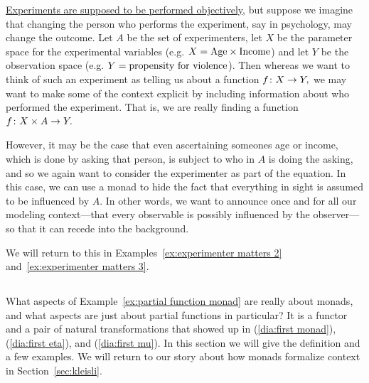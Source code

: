 \documentclass[../main/CT4S-EN-RU]{subfiles}
\begin{document}
\begin{exampleRUS}\label{ex:partial function monad}
\end{exampleRUS}

\begin{applicationENG}\label{app:experimenter matters}
\href{http://en.wikipedia.org/wiki/Observer-expectancy_effect}{\text Experiments are supposed to be performed objectively}, but suppose we imagine that changing the person who performs the experiment, say in psychology, may change the outcome. Let $A$ be the set of experimenters, let $X$ be the parameter space for the experimental variables (e.g. $X=\textnormal{Age}\times\textnormal{Income}$) and let $Y$ be the observation space (e.g. $Y=\textnormal{propensity for violence}$). Then whereas we want to think of such an experiment as telling us about a function $f\colon X\rightarrow Y,$ we may want to make some of the context explicit by including information about who performed the experiment. That is, we are really finding a function $f\colon X\times A\rightarrow Y.$ 

However, it may be the case that even ascertaining someones age or income, which is done by asking that person, is subject to who in $A$ is doing the asking, and so we again want to consider the experimenter as part of the equation. In this case, we can use a monad to hide the fact that everything in sight is assumed to be influenced by $A.$ In other words, we want to announce once and for all our modeling context—that every observable is possibly influenced by the observer—so that it can recede into the background.

We will return to this in Examples~\ref{ex:experimenter matters 2} and~\ref{ex:experimenter matters 3}.
\end{applicationENG}

\begin{applicationRUS}\label{app:experimenter matters}
\end{applicationRUS}


\subsection{}

\begin{blockENG}
What aspects of Example~\ref{ex:partial function monad} are really about monads, and what aspects are just about partial functions in particular? It is a functor and a pair of natural transformations that showed up in (\ref{dia:first monad}), (\ref{dia:first eta}), and (\ref{dia:first mu}). In this section we will give the definition and a few examples. We will return to our story about how monads formalize context in Section~\ref{sec:kleisli}.
\end{blockENG}
\end{document}
